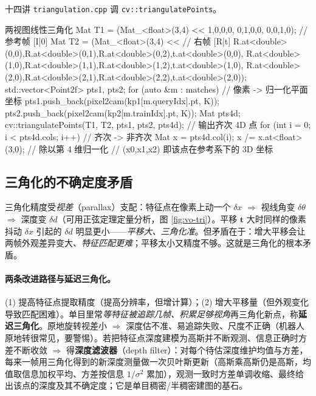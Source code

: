 \begin{practice}
十四讲 \texttt{triangulation.cpp}\cite{gaoxiang2019slam14} 调 \texttt{cv::triangulatePoints}。
\begin{codebox}[C++]{两视图线性三角化}
Mat T1 = (Mat_<float>(3,4) << 1,0,0,0, 0,1,0,0, 0,0,1,0);   // 参考帧 [I|0]
Mat T2 = (Mat_<float>(3,4) <<                                  // 右帧 [R|t]
  R.at<double>(0,0),R.at<double>(0,1),R.at<double>(0,2),t.at<double>(0,0),
  R.at<double>(1,0),R.at<double>(1,1),R.at<double>(1,2),t.at<double>(1,0),
  R.at<double>(2,0),R.at<double>(2,1),R.at<double>(2,2),t.at<double>(2,0));
std::vector<Point2f> pts1, pts2;
for (auto &m : matches) {                 // 像素 -> 归一化平面坐标
  pts1.push_back(pixel2cam(kp1[m.queryIdx].pt, K));
  pts2.push_back(pixel2cam(kp2[m.trainIdx].pt, K));
}
Mat pts4d;
cv::triangulatePoints(T1, T2, pts1, pts2, pts4d);   // 输出齐次 4D 点
for (int i = 0; i < pts4d.cols; i++) {              // 齐次 -> 非齐次
  Mat x = pts4d.col(i);  x /= x.at<float>(3,0);     // 除以第 4 维归一化
  // (x0,x1,x2) 即该点在参考系下的 3D 坐标
}
\end{codebox}
\end{practice}

\subsection{三角化的不确定度矛盾}
\label{sec:vo-tri-uncertainty}

\begin{insight}[视差—深度不确定度矛盾]
三角化精度受\emph{视差}（parallax）支配\cite{gaoxiang2019slam14}：特征点在像素上动一个 $\delta x$ $\Rightarrow$ 视线角变 $\delta\theta$ $\Rightarrow$ 深度变 $\delta d$（可用正弦定理定量分析，图 \ref{fig:vo-tri}）。平移 $\mathbf{t}$ 大时同样的像素抖动 $\delta x$ 引起的 $\delta d$ 明显更小——\emph{平移大、三角化准}。但矛盾在于：增大平移会让两帧外观差异变大、\emph{特征匹配更难}；平移太小又精度不够。这就是三角化的根本矛盾。
\end{insight}

\paragraph{两条改进路径与延迟三角化\cite{gaoxiang2019slam14}。}
(1) 提高特征点提取精度（提高分辨率，但增计算）；(2) 增大平移量（但外观变化导致匹配困难）。单目里常\emph{等特征被追踪几帧、积累足够视角}再三角化新点，称\textbf{延迟三角化}。原地旋转视差小 $\Rightarrow$ 深度估不准、易追踪失败、尺度不正确（机器人原地转很常见，要警惕）。若把特征点深度建模为高斯并不断观测、信息正确时方差不断收敛 $\Rightarrow$ 得\textbf{深度滤波器}（depth filter）：对每个待估深度维护均值与方差，每来一帧用三角化得到的新深度测量做一次贝叶斯更新（高斯乘高斯仍是高斯，均值取信息加权平均、方差按信息 $1/\sigma^2$ 累加），观测一致时方差单调收缩、最终给出该点的深度及其不确定度；它是单目稠密/半稠密建图的基石。

